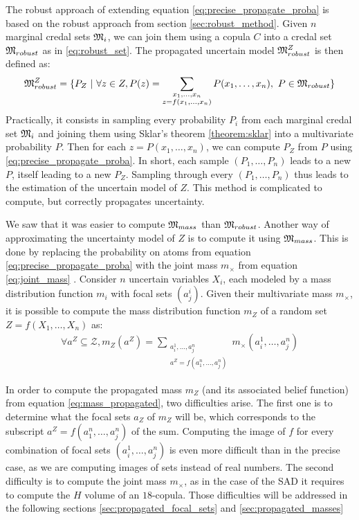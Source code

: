 The robust approach of extending equation \eqref{eq:precise_propagate_proba} is based on the robust approach from section \ref{sec:robust_method}. Given $n$ marginal credal sets ${\mathfrak{M}}_i$, we can join them using a copula $C$ into a credal set ${\mathfrak{M}}_{robust}$ as in \eqref{eq:robust_set}. The propagated uncertain model ${\mathfrak{M}}^Z_{robust}$ is then defined as:
\begin{align}
    {\mathfrak{M}}^Z_{robust} = \{P_Z~|~\forall z\in Z, P(z)=\sum_{\substack{x_1,\dots,x_n\\z=f(x_1,\dots,x_n)}}P(x_1,\dots,x_n), ~P\in{\mathfrak{M}}_{robust}\}
\end{align}
Practically, it consists in sampling every probability $P_i$ from each marginal credal set ${\mathfrak{M}}_i$ and joining them using Sklar's theorem \ref{theorem:sklar} into a multivariate probability $P$. Then for each $z=P(x_1,\dots,x_n)$, we can compute $P_Z$ from $P$ using \eqref{eq:precise_propagate_proba}. In short, each sample $(P_1,\dots,P_n)$ leads to a new $P$, itself leading to a new $P_Z$. Sampling through every $(P_1,\dots,P_n)$ thus leads to the estimation of the uncertain model of $Z$. This method is complicated to compute, but correctly propagates uncertainty.

We saw that it was easier to compute ${\mathfrak{M}}_{mass}$ than ${\mathfrak{M}}_{robust}$. Another way of approximating the uncertainty model of $Z$ is to compute it using ${\mathfrak{M}}_{mass}$. This is done by replacing the probability on atoms from equation \eqref{eq:precise_propagate_proba} with the joint mass $m_\times$ from equation \eqref{eq:joint_mass} \cite{gray_dependent_2021}. Consider $n$ uncertain variables $X_i$, each modeled by a mass distribution function $m_i$ with focal sets $(a^i_j)$. Given their multivariate mass $m_\times$, it is possible to compute the mass distribution function $m_Z$ of a random set $Z=f(X_1,\dots,X_n)$ as:
\begin{align}
    \forall a^Z\subseteq\mathcal{Z}, m_Z(a^Z) = \sum_{\substack{a^1_i, \dots, a^n_j\\a^Z=f(a^n_1,\dots, a^n_j)}}m_\times(a^1_i, \dots, a^n_j)\label{eq:mass_propagated}
\end{align}

In order to compute the propagated mass $m_Z$ (and its associated belief function) from equation \eqref{eq:mass_propagated}, two difficulties arise. The first one is to determine what the focal sets $a_Z$ of $m_Z$ will be, which corresponds to the subscript $a^Z=f(a^n_1,\dots, a^n_j)$ of the sum. Computing the image of $f$ for every combination of focal sets $(a^1_i, \dots, a^n_j)$ is even more difficult than in the precise case, as we are computing images of sets instead of real numbers. The second difficulty is to compute the joint mass $m_\times$, as in the case of the SAD it requires to compute the $H$ volume of an $18$-copula. Those difficulties will be addressed in the following sections \ref{sec:propagated_focal_sets} and \ref{sec:propagated_masses}

